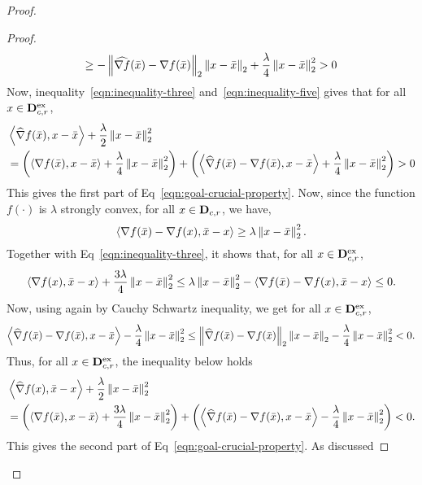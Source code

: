\begin{proof}
\begin{proof}
\begin{equation}
	\geq -\left\|{\widehat{\nabla f}(\bar{x}) - \nabla f(\bar{x})}\right\|_2\left\|{ x- \bar{x}}\right\|_2	
		+ \frac{\lambda}{4}\left\|{x-\bar{x}}\right\|_2^2 > 0
\end{equation}
Now, inequality~\eqref{eqn:inequality-three} and~\eqref{eqn:inequality-five} gives that
for all $x\in \mathbf{D}_{c, r}^\text{ex}$, 
\begin{align}
&\left<\widehat{\nabla }f(\bar{x}), x- \bar{x}\right>  + \frac{\lambda}{2}\left\|{x-\bar{x}}\right\|_2^2 \nonumber \\
&= \left(\left< \nabla f(\bar{x}), x- \bar{x}\right>  + \frac{\lambda}{4}\left\|{x-\bar{x}}\right\|_2^2 \right)
	+ \left( \left<\widehat{\nabla}f(\bar{x}) - \nabla f(\bar{x}), x- \bar{x}\right> 
		+ \frac{\lambda}{4}\left\|{x-\bar{x}}\right\|_2^2\right) > 0 
	\label{eqn:first-part-of-S}
\end{align}
This gives the first part of Eq~\eqref{eqn:goal-crucial-property}. Now, since the function 
$f(\cdot)$ is $\lambda$ strongly convex, for all $x\in \mathbf{D}_{c, r}$, we have, 
\begin{equation*}
\left<\nabla f(\bar{x}) - \nabla f(x), \bar{x}-x\right> \geq \lambda \left\|{x-\bar{x}}\right\|_2^2.
\end{equation*}
Together with Eq~\eqref{eqn:inequality-three}, it shows that, for all $x\in \mathbf{D}_{c, r}^\text{ex}$, 
\begin{equation}
\label{eqn:inequality-four}
\left<\nabla f(x), \bar{x} - x\right> + \frac{3\lambda}{4}\left\|{x-\bar{x}}\right\|_2^2 \leq 
	\lambda \left\|{x-\bar{x}}\right\|_2^2 - \left<\nabla f(\bar{x}) - \nabla f(x), \bar{x}-x\right> \leq 0.
\end{equation}
Now, using again by Cauchy Schwartz inequality,  we get for all $x\in\mathbf{D}_{c,r }^\text{ex}$,
\begin{equation}
\left<\widehat{\nabla }f(\bar{x}) - \nabla f(\bar{x}), x- \bar{x}\right> 
		- \frac{\lambda}{4}\left\|{x-\bar{x}}\right\|_2^2 
	\leq \left\|{\widehat{\nabla }f(\bar{x}) - \nabla f(\bar{x})}\right\|_2\left\|{ x- \bar{x}}\right\|_2 
		- \frac{\lambda}{4}\left\|{x-\bar{x}}\right\|_2^2  < 0.
\end{equation}
Thus, for all  $x\in \mathbf{D}_{c, r}^\text{ex}$,  the inequality below holds
\begin{align*}
&\left<\widehat{\nabla} f(x), \bar{x}- x\right>  + \frac{\lambda}{2}\left\|{x-\bar{x}}\right\|_2^2 \\
&= \left(\left< \nabla f(\bar{x}), x- \bar{x}\right>  + \frac{3\lambda}{4}\left\|{x-\bar{x}}\right\|_2^2 \right)
	+ \left( \left<\widehat{\nabla} f(\bar{x}) - \nabla f(\bar{x}), x- \bar{x}\right> 
		- \frac{\lambda}{4}\left\|{x-\bar{x}}\right\|_2^2\right) < 0. 
\end{align*}
This gives the second part of Eq~\eqref{eqn:goal-crucial-property}. As discussed 

\end{proof}
\end{proof}
